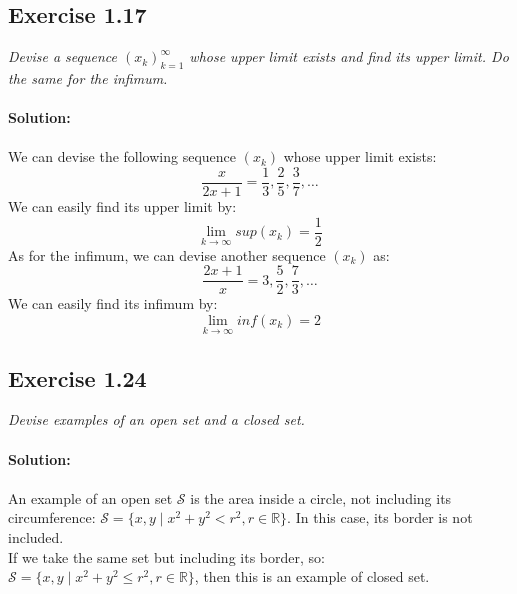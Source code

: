 \subsection{Exercise 1.17}
\emph{Devise a sequence $(x_k)_{k=1}^{\infty}$ whose upper limit exists and find its upper limit.
Do the same for the infimum.}\\
\\
\textbf{Solution:}\\
\\
We can devise the following sequence $(x_k)$ whose upper limit exists:
\begin{equation}
    \frac{x}{2x+1} = \frac{1}{3}, \frac{2}{5}, \frac{3}{7}, \dots
\end{equation}
We can easily find its upper limit by:
\begin{equation}
    \lim_{k \to \infty} sup (x_k)= \frac{1}{2}
\end{equation}
As for the infimum, we can devise another sequence $(x_k)$ as:
\begin{equation}
    \frac{2x+1}{x} = 3, \frac{5}{2}, \frac{7}{3}, \dots
\end{equation}
We can easily find its infimum by:
\begin{equation}
    \lim_{k \to \infty} inf (x_k) = 2
\end{equation}
\QEDB

\subsection{Exercise 1.24}
\emph{Devise examples of an open set and a closed set.}\\
\\
\textbf{Solution:}\\
\\
An example of an open set $\mathcal{S}$ is the area inside a circle, not including its circumference: $\mathcal{S} = \{x, y \mid x^2 + y^2 < r^2, r \in \mathbb{R} \} $. In this case, its border is not included.\\
If we take the same set but including its border, so: $\mathcal{S} = \{x, y \mid x^2 + y^2 \leq r^2, r \in \mathbb{R} \} $, then this is an example of closed set.
\QEDB

